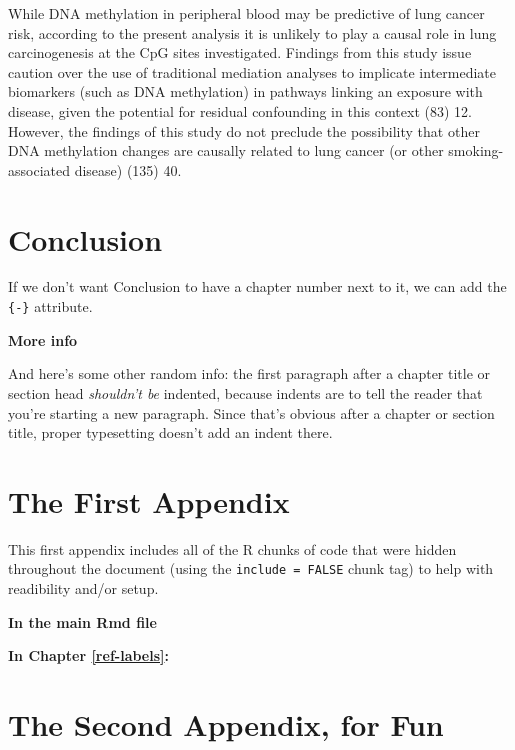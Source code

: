 \documentclass[11pt,twoside]{bristolthesis}
\begin{document}
While DNA methylation in peripheral blood may be predictive of lung cancer risk, according to the present analysis it is unlikely to play a causal role in lung carcinogenesis at the CpG sites investigated. Findings from this study issue caution over the use of traditional mediation analyses to implicate intermediate biomarkers (such as DNA methylation) in pathways linking an exposure with disease, given the potential for residual confounding in this context (83) 12. However, the findings of this study do not preclude the possibility that other DNA methylation changes are causally related to lung cancer (or other smoking-associated disease) (135) 40.

\hypertarget{conclusion}{%
\chapter*{Conclusion}\label{conclusion}}

If we don't want Conclusion to have a chapter number next to it, we can add the \texttt{\{-\}} attribute.

\textbf{More info}

And here's some other random info: the first paragraph after a chapter title or section head \emph{shouldn't be} indented, because indents are to tell the reader that you're starting a new paragraph. Since that's obvious after a chapter or section title, proper typesetting doesn't add an indent there.

\appendix

\hypertarget{the-first-appendix}{%
\chapter{The First Appendix}\label{the-first-appendix}}

This first appendix includes all of the R chunks of code that were hidden throughout the document (using the \texttt{include\ =\ FALSE} chunk tag) to help with readibility and/or setup.

\textbf{In the main Rmd file}

\textbf{In Chapter \ref{ref-labels}:}

\hypertarget{the-second-appendix-for-fun}{%
\chapter{The Second Appendix, for Fun}\label{the-second-appendix-for-fun}}
\end{document}
